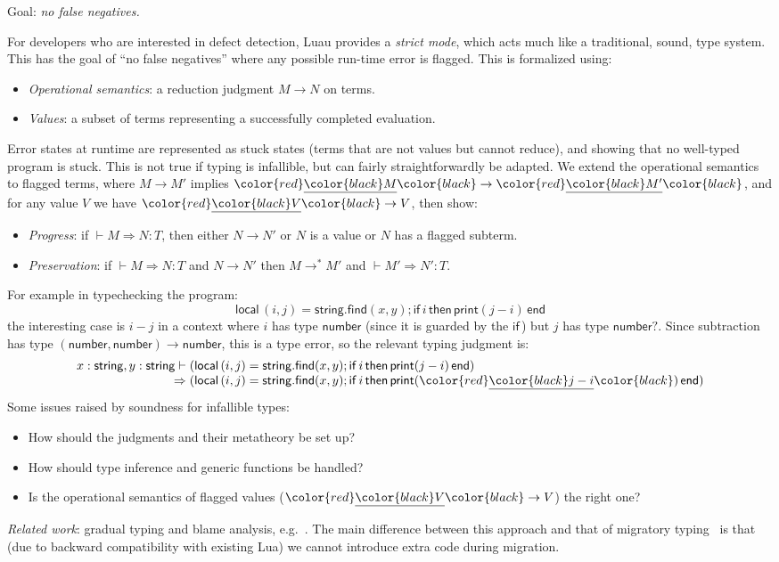 \documentclass[acmsmall]{acmart}
\newcommand{\squnder}[1]{\color{red}\underline{{\color{black}#1}}\color{black}}
\newcommand{\NUMBER}{\mathsf{number}}
\newcommand{\STRING}{\mathsf{string}}
\newcommand{\IF}{\mathsf{if}\,}
\newcommand{\LOCAL}{\mathsf{local}\,}
\newcommand{\THEN}{\,\mathsf{then}\,}
\newcommand{\END}{\,\mathsf{end}}
\newcommand{\FIND}{\mathsf{find}}
\newcommand{\PRINT}{\mathsf{print}}
\begin{document}
Goal: \emph{no false negatives.}

For developers who are interested in defect detection, Luau provides a \emph{strict mode},
which acts much like a traditional, sound, type system. This has the goal of ``no false negatives''
where any possible run-time error is flagged. This is formalized using:
\begin{itemize}
\item \emph{Operational semantics}: a reduction judgment $M \rightarrow N$ on terms.
\item \emph{Values}: a subset of terms representing a successfully completed evaluation.
\end{itemize}
Error states at runtime are represented as stuck states (terms that are not
values but cannot reduce), and showing that no well-typed program is
stuck. This is not true if typing is infallible, but can fairly
straightforwardly be adapted. We extend the operational semantics to flagged terms,
where $M \rightarrow M'$ implies $\squnder{M} \rightarrow \squnder{M'}$, and
for any value $V$ we have $\squnder{V} \rightarrow V$, then show:
\begin{itemize}
\item \emph{Progress}: if ${} \vdash M \Rightarrow N : T$, then either $N \rightarrow N'$ or $N$ is a value or $N$ has a flagged subterm.
\item \emph{Preservation}: if ${} \vdash M \Rightarrow N : T$ and $N \rightarrow N'$ then  $M \rightarrow^*M'$ and ${} \vdash M' \Rightarrow N' : T$.
\end{itemize}
For example in typechecking the program:
\[
  \LOCAL (i,j) = \STRING.\FIND(x, y);
  \IF i \THEN \PRINT(j-i) \END
\]
the interesting case is $i-j$ in a context where  $i$ has type
$\NUMBER$ (since it is guarded by the $\IF$) but $j$ has type
$\NUMBER?$. Since subtraction has type $(\NUMBER, \NUMBER) \rightarrow \NUMBER$,
this is a type error, so the relevant typing judgment is:
\[\begin{array}{r@{}l}
  x: \STRING, y: \STRING \vdash {}&
  (\LOCAL (i,j) = \STRING.\FIND(x, y);
  \IF i \THEN \PRINT(j-i) \END) \\
  \Rightarrow {}&
  (\LOCAL (i,j) = \STRING.\FIND(x, y);
  \IF i \THEN \PRINT(\squnder{j-i}) \END)
\end{array}\]
Some issues raised by soundness for infallible types:
\begin{itemize}
\item How should the judgments and their metatheory be set up?
\item How should type inference and generic functions be handled?
\item Is the operational semantics of flagged values
  ($\squnder{V} \rightarrow V$) the right one?
\end{itemize}
\emph{Related work}: gradual typing and blame analysis, e.g.~\cite{GradualTyping,WellTyped,Contracts}.
The main difference between this approach and that of migratory typing~\cite{MigratoryTyping}
is that (due to backward compatibility with existing Lua) we cannot introduce
extra code during migration.
\end{document}
